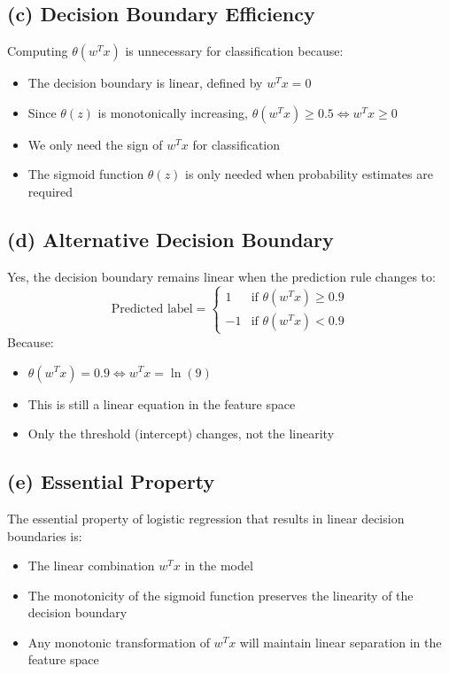 \documentclass{article}
\begin{document}
\subsection*{(c) Decision Boundary Efficiency}
Computing $\theta(w^T x)$ is unnecessary for classification because:
\begin{itemize}
    \item The decision boundary is linear, defined by $w^T x = 0$
    \item Since $\theta(z)$ is monotonically increasing, $\theta(w^T x) \geq 0.5 \iff w^T x \geq 0$
    \item We only need the sign of $w^T x$ for classification
    \item The sigmoid function $\theta(z)$ is only needed when probability estimates are required
\end{itemize}

\subsection*{(d) Alternative Decision Boundary}
Yes, the decision boundary remains linear when the prediction rule changes to:
\[
\text{Predicted label} =
\begin{cases}
1 & \text{if } \theta(w^T x) \geq 0.9 \\
-1 & \text{if } \theta(w^T x) < 0.9
\end{cases}
\]
Because:
\begin{itemize}
    \item $\theta(w^T x) = 0.9 \iff w^T x = \ln(9)$
    \item This is still a linear equation in the feature space
    \item Only the threshold (intercept) changes, not the linearity
\end{itemize}

\subsection*{(e) Essential Property}
The essential property of logistic regression that results in linear decision boundaries is:
\begin{itemize}
    \item The linear combination $w^T x$ in the model
    \item The monotonicity of the sigmoid function preserves the linearity of the decision boundary
    \item Any monotonic transformation of $w^T x$ will maintain linear separation in the feature space
\end{itemize}
\end{document}
